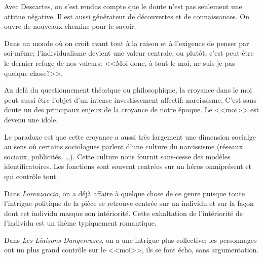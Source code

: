 \documentclass[12pt]{article}
\begin{document}
Avec Descartes, on s'est rendus compte que le doute n'est pas seulement une attitue négative.
Il est aussi générateur de découvertes et de connaissances.
On ouvre de nouveaux chemins pour le savoir.\par
Dans un monde où on croit avant tout à la raison et à l'exigence de penser par soi-même; l'individualisme devient une valeur centrale, ou plutôt, c'est peut-être le dernier refuge de nos valeurs: <<Moi donc, à tout le moi, ne suis-je pas quelque chose?>>.\par
Au delà du questionnement théorique ou philosophique, la croyance dans le moi peut aussi être l'objet d'un intense investissement affectif: narcissisme.
C'est sans doute un des principaux enjeux de la croyance de notre époque.
Le <<moi>> est devenu une idole.\par
Le paradoxe est que cette croyance a aussi très largement une dimension socialge au sens où certains sociologues parlent d'une culture du narcissisme (réseaux sociaux, publicités, \dots).
Cette culture nous fournit sans-cesse des modèles identificatoires.
Les fonctions sont souvent centrées sur un héros omniprésent et qui contrôle tout.\par
Dans \emph{Lorenzaccio}, on a déjà affaire à quelque chose de ce genre puisque toute l'intrigue politique de la pièce se retrouve centrée sur un individu et sur la façon dont cet individu masque son intériorité.
Cette exhaltation de l'intériorité de l'individu est un thème typiquement romantique.\par
Dans \emph{Les Liaisons Dangereuses}, on a une intrigue plus collective: les personnages ont un plus grand contrôle sur le <<moi>>, ils se font écho, sans argumentation.
\end{document}
